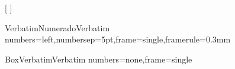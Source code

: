 \titleformat{\section}{
    \normalfont
    \Large
    \bfseries
  }{\thesection}{1em}{}[{
    \color{RoyalRed}
    \titlerule[0.8pt]}]



\setlength{\parindent}{2.5em}

\setlength{\parskip}{0.5em}





\DefineVerbatimEnvironment
    {VerbatimNumerado}{Verbatim}
    {numbers=left,numbersep=5pt,frame=single,framerule=0.3mm}

\DefineVerbatimEnvironment
    {BoxVerbatim}{Verbatim}
    {numbers=none,frame=single}
      


\newcommand{\atividade}{
  \begin{wrapfigure}[3]{R}{1cm}
    \centering
    \vspace{-11pt}
    \texttt{[image: imgs/atividade.png]}
  \end{wrapfigure}
}

\newcommand{\importante}{
  \begin{wrapfigure}[3]{R}{1cm}
    \centering
    \vspace{-11pt}
    \texttt{[image: imgs/importante.png]}
  \end{wrapfigure}
}

